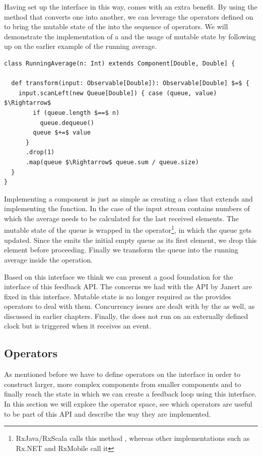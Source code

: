 Having set up the \comp interface in this way, comes with an extra benefit. By using the  method that converts one \obs into another, we can leverage the operators defined on \obs to bring the mutable state of the \comp into the sequence of operators. We will demonstrate the implementation of a \comp and the usage of mutable state by following up on the earlier example of the running average.

\begin{minipage}{\linewidth}
\begin{lstlisting}[style=ScalaStyle, caption={Implementation of \code{RunningAverage} using the \comp interface}, label={lst:running-average-final}]
class RunningAverage(n: Int) extends Component[Double, Double] {

  def transform(input: Observable[Double]): Observable[Double] $=$ {
    input.scanLeft(new Queue[Double]) { case (queue, value) $\Rightarrow$ 
        if (queue.length $==$ n)
          queue.dequeue()
        queue $+=$ value
      }
      .drop(1)
      .map(queue $\Rightarrow$ queue.sum / queue.size)
  }
}
\end{lstlisting}
\end{minipage}

Implementing a component is just as simple as creating a class that extends \comp and implementing the  function. In the case of  the input stream contains numbers of which the average needs to be calculated for the last  received elements. The mutable state of the queue is wrapped in the  operator\footnote{RxJava/RxScala calls this method , whereas other implementations such as Rx.NET and RxMobile call it }, in which the queue gets updated. Since the  emits the initial empty queue as its first element, we drop this element before proceeding. Finally we transform the queue into the running average inside the  operation.

Based on this interface we think we can present a good foundation for the interface of this feedback API. The concerns we had with the API by Janert are fixed in this interface. Mutable state is no longer required as the \obs provides operators to deal with them. Concurrency issues are dealt with by the \obs as well, as discussed in earlier chapters. Finally, the \comp does not run on an externally defined clock but is triggered when it receives an event.

\subsection{Operators}
As mentioned before we have to define operators on the \comp interface in order to construct larger, more complex components from smaller components and to finally reach the state in which we can create a feedback loop using this interface. In this section we will explore the operator space, see which operators are useful to be part of this API and describe the way they are implemented.

